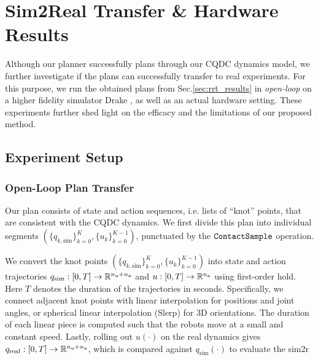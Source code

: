 \section{Sim2Real Transfer \& Hardware Results}\label{sec:sim2real}
Although our planner successfully plans through our CQDC dynamics model, we further investigate if the plans can successfully transfer to real experiments. For this purpose, we run the obtained plans from Sec.\ref{sec:rrt_results} in \emph{open-loop} on a higher fidelity simulator Drake \cite{drake}, as well as an actual hardware setting. These experiments further shed light on the efficacy and the limitations of our proposed method. 

\subsection{Experiment Setup}
\subsubsection{Open-Loop Plan Transfer}
\newcommand{\qsimcoarse}{\{q_{k,\mathrm{sim}}\}^K_{k=0}}
\newcommand{\qsimfine}{\{q_{t,\mathrm{sim}}\}^T_{t=0}}
\newcommand{\ucoarse}{\{u_k\}^{K-1}_{k=0}}

\newcommand{\qsimp}{q_{\mathrm{sim}}}
\newcommand{\qrealp}{q_{\mathrm{real}}}
\newcommand{\qusimp}{q^\mathrm{u}_{\mathrm{sim}}}
\newcommand{\qurealp}{q^\mathrm{u}_{\mathrm{real}}}

Our plan consists of state and action sequences, i.e. lists of ``knot'' points, that are consistent with the CQDC dynamics. We first divide this plan into individual segments $\left(\qsimcoarse, \ucoarse \right)$, punctuated by the $\ContactSample$ operation. 

We convert the knot points $(\qsimcoarse, \ucoarse)$ into state and action trajectories $q_\mathrm{sim}: [0, T] \rightarrow \R[\nU + \nA]$ and $u: [0, T] \rightarrow \R[\nA]$ using first-order hold. Here $T$ denotes the duration of the trajectories in seconds. Specifically, we connect adjacent knot points with linear interpolation for positions and joint angles, or spherical linear interpolation (Slerp) for 3D orientations. The duration of each linear piece is computed such that the robots move at a small and constant speed. Lastly, rolling out $u(\cdot)$ on the real dynamics gives $q_\mathrm{real}: [0, T] \rightarrow \R[\nU + \nA]$, which is compared against $q_\mathrm{sim}(\cdot)$ to evaluate the sim2r


